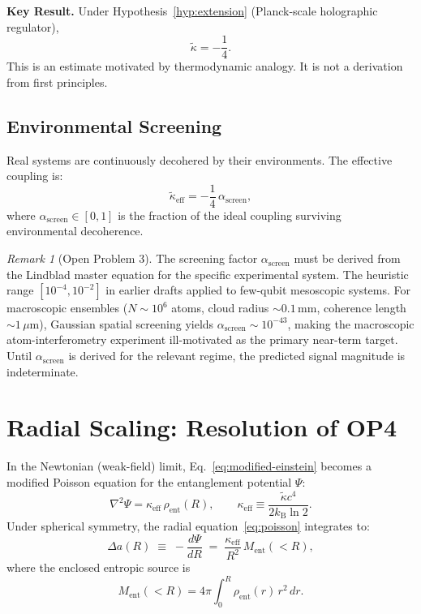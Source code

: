 \documentclass[12pt,letterpaper]{article}
\theoremstyle{plain}
\theoremstyle{definition}
\theoremstyle{remark}
\newtheorem{remark}[theorem]{Remark}
\newenvironment{keyresult}{%
  \begin{framed}\noindent\textbf{Key Result.}\quad}{%
  \end{framed}}
\newcommand{\kB}{k_{\mathrm{B}}}
\newcommand{\lnTwo}{\ln 2}
\newcommand{\kt}{\tilde{\kappa}}
\newcommand{\kteff}{\tilde{\kappa}_{\mathrm{eff}}}
\newcommand{\Ment}{M_{\mathrm{ent}}}
\newcommand{\asc}{\alpha_{\mathrm{screen}}}
\newcommand{\Deltaa}{\Delta a}
\begin{document}
\begin{keyresult}
Under Hypothesis~\ref{hyp:extension} (Planck-scale holographic regulator),
\begin{equation}
  \kt = -\frac{1}{4}.
  \label{eq:kappa-result}
\end{equation}
This is an estimate motivated by thermodynamic analogy.  It is not a derivation from first
principles.
\end{keyresult}

\subsection{Environmental Screening}

Real systems are continuously decohered by their environments.  The effective coupling is:
\begin{equation}
  \kteff = -\frac{1}{4}\,\asc,
  \label{eq:kappa-eff}
\end{equation}
where $\asc \in [0,1]$ is the fraction of the ideal coupling surviving environmental
decoherence.

\begin{remark}[Open Problem 3]
The screening factor $\asc$ must be derived from the Lindblad master equation for the
specific experimental system.  The heuristic range $[10^{-4}, 10^{-2}]$ in earlier drafts
applied to few-qubit mesoscopic systems.  For macroscopic ensembles ($N \sim 10^{6}$ atoms,
cloud radius $\sim 0.1$\,mm, coherence length $\sim 1\,\mu$m), Gaussian spatial screening
yields $\asc \sim 10^{-43}$, making the macroscopic atom-interferometry experiment
ill-motivated as the primary near-term target.  Until $\asc$ is derived for the relevant
regime, the predicted signal magnitude is indeterminate.
\end{remark}

\section{Radial Scaling: Resolution of OP4}
\label{sec:radial}

In the Newtonian (weak-field) limit, Eq.~\eqref{eq:modified-einstein} becomes a modified
Poisson equation for the entanglement potential $\Psi$:
\begin{equation}
  \nabla^{2}\Psi = \kappa_{\mathrm{eff}}\,\rho_{\mathrm{ent}}(R),
  \qquad
  \kappa_{\mathrm{eff}} \equiv \frac{\kt c^{4}}{2\kB\lnTwo}.
  \label{eq:poisson}
\end{equation}
Under spherical symmetry, the radial equation~\eqref{eq:poisson} integrates to:
\begin{equation}
  \Deltaa(R)
  \;\equiv\;
  -\frac{d\Psi}{dR}
  \;=\;
  \frac{\kappa_{\mathrm{eff}}}{R^{2}}\,\Ment(<R),
  \label{eq:delta-a}
\end{equation}
where the enclosed entropic source is
\begin{equation}
  \Ment(<R) = 4\pi\int_{0}^{R}\rho_{\mathrm{ent}}(r)\,r^{2}\,dr.
  \label{eq:Ment}
\end{equation}
\end{document}
